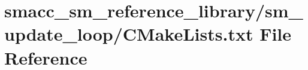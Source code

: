 \hypertarget{sm__reference__library_2sm__update__loop_2CMakeLists_8txt}{}\section{smacc\+\_\+sm\+\_\+reference\+\_\+library/sm\+\_\+update\+\_\+loop/\+C\+Make\+Lists.txt File Reference}
\label{sm__reference__library_2sm__update__loop_2CMakeLists_8txt}
